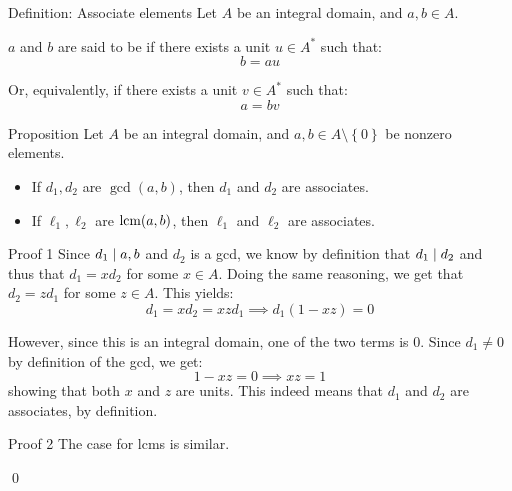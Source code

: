 \documentclass[a4paper]{article}
\begin{document}
\begin{parag}{Definition: Associate elements}
    Let $A$ be an integral domain, and $a, b \in A$.

    $a$ and $b$ are said to be  if there exists a unit $u \in A^*$ such that: 
    \[b = au\]

    Or, equivalently, if there exists a unit $v \in A^*$ such that: 
    \[a = bv\]
\end{parag}

\begin{parag}{Proposition}
    Let $A$ be an integral domain, and $a, b \in A \setminus \left\{0\right\}$ be nonzero elements.

    \begin{itemize}
        \item If $d_1, d_2$ are $\gcd\left(a, b\right)$, then $d_1$ and $d_2$ are associates.
        \item If $\ell _1, \ell _2$ are $\lcm\left(a, b\right)$, then $\ell _1$ and $\ell _2$ are associates.
    \end{itemize}

    \begin{subparag}{Proof 1}
        Since $d_1 \mid a, b$ and $d_2$ is a gcd, we know by definition that $d_1 \mid d_2$ and thus that $d_1 = x d_2$ for some $x \in A$. Doing the same reasoning, we get that $d_2 = zd_1$ for some $z \in A$. This yields: 
        \[d_1 = x d_2 = xz d_1 \implies d_1\left(1 - xz\right) = 0\]
        
        However, since this is an integral domain, one of the two terms is 0. Since $d_1 \neq 0$ by definition of the gcd, we get: 
        \[1 - xz = 0 \implies xz = 1\]
        showing that both $x$ and $z$ are units. This indeed means that $d_1$ and $d_2$ are associates, by definition.
    \end{subparag}

    \begin{subparag}{Proof 2}
        The case for lcms is similar.

        \qed
    \end{subparag}
\end{parag}
\end{document}
